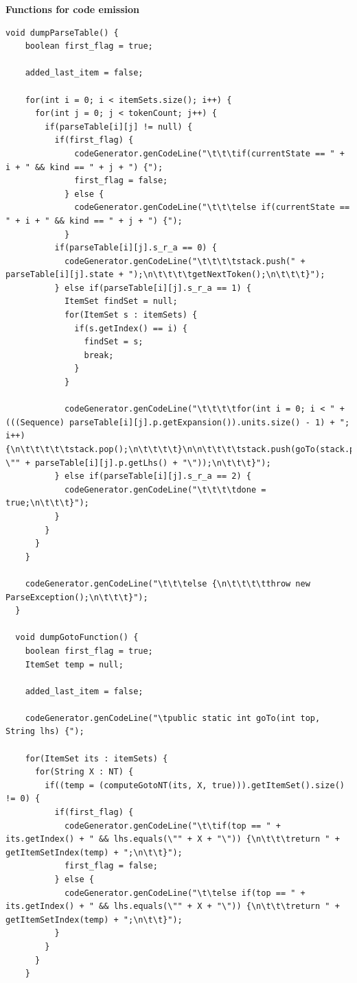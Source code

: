 \documentclass[oneside]{book}
\begin{document}
\textbf{Functions for code emission}
\begin{lstlisting}
void dumpParseTable() {
    boolean first_flag = true;
    
    added_last_item = false;
    
    for(int i = 0; i < itemSets.size(); i++) {
      for(int j = 0; j < tokenCount; j++) {
        if(parseTable[i][j] != null) {
          if(first_flag) {
              codeGenerator.genCodeLine("\t\t\tif(currentState == " + i + " && kind == " + j + ") {");
              first_flag = false;
            } else {
              codeGenerator.genCodeLine("\t\t\telse if(currentState == " + i + " && kind == " + j + ") {");
            }
          if(parseTable[i][j].s_r_a == 0) {
            codeGenerator.genCodeLine("\t\t\t\tstack.push(" + parseTable[i][j].state + ");\n\t\t\t\tgetNextToken();\n\t\t\t}");
          } else if(parseTable[i][j].s_r_a == 1) {
            ItemSet findSet = null;
            for(ItemSet s : itemSets) {
              if(s.getIndex() == i) {
                findSet = s;
                break;
              }
            }
            
            codeGenerator.genCodeLine("\t\t\t\tfor(int i = 0; i < " + (((Sequence) parseTable[i][j].p.getExpansion()).units.size() - 1) + "; i++) {\n\t\t\t\t\tstack.pop();\n\t\t\t\t}\n\n\t\t\t\tstack.push(goTo(stack.peek(), \"" + parseTable[i][j].p.getLhs() + "\"));\n\t\t\t}");
          } else if(parseTable[i][j].s_r_a == 2) {
            codeGenerator.genCodeLine("\t\t\t\tdone = true;\n\t\t\t}");
          }
        }
      }
    }
    
    codeGenerator.genCodeLine("\t\t\telse {\n\t\t\t\tthrow new ParseException();\n\t\t\t}");
  }
  
  void dumpGotoFunction() {
    boolean first_flag = true;
    ItemSet temp = null;
    
    added_last_item = false;
    
    codeGenerator.genCodeLine("\tpublic static int goTo(int top, String lhs) {");
    
    for(ItemSet its : itemSets) {
      for(String X : NT) {
        if((temp = (computeGotoNT(its, X, true))).getItemSet().size() != 0) {
          if(first_flag) {
            codeGenerator.genCodeLine("\t\tif(top == " + its.getIndex() + " && lhs.equals(\"" + X + "\")) {\n\t\t\treturn " + getItemSetIndex(temp) + ";\n\t\t}");
            first_flag = false;
          } else {
            codeGenerator.genCodeLine("\t\telse if(top == " + its.getIndex() + " && lhs.equals(\"" + X + "\")) {\n\t\t\treturn " + getItemSetIndex(temp) + ";\n\t\t}");
          }
        }
      }
    }
    

\end{lstlisting}
\end{document}
